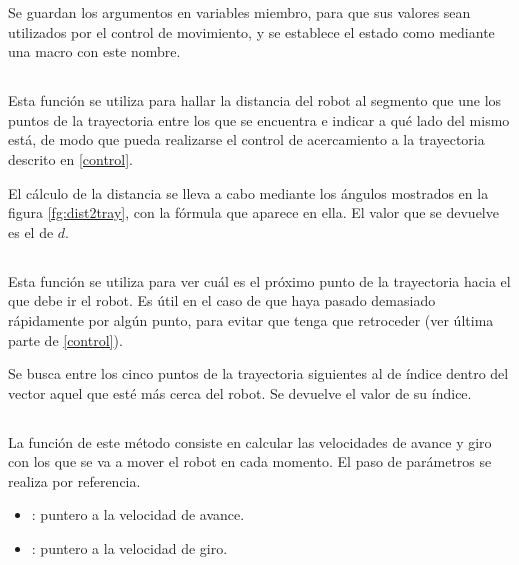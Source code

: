 \noindent
Se guardan los argumentos en variables miembro, para que sus valores sean utilizados por el control de movimiento, y se establece el estado como  mediante una macro con este nombre.

\subsection{}

\noindent
{}

\noindent
Esta función se utiliza para hallar la distancia del robot al segmento que une los puntos de la trayectoria entre los que se encuentra e indicar a qué lado del mismo está, de modo que pueda realizarse el control de acercamiento a la trayectoria descrito en \ref{control}.

\noindent
El cálculo de la distancia se lleva a cabo mediante los ángulos mostrados en la figura \ref{fg:dist2tray}, con la fórmula que aparece en ella. El valor que se devuelve es el de $d$.

\subsection{}

\noindent
{}

\noindent
Esta función se utiliza para ver cuál es el próximo punto de la trayectoria hacia el que debe ir el robot. Es útil en el caso de que haya pasado demasiado rápidamente por algún punto, para evitar que tenga que retroceder (ver última parte de \ref{control}).

\noindent
Se busca entre los cinco puntos de la trayectoria siguientes al de índice  dentro del vector  aquel que esté más cerca del robot. Se devuelve el valor de su índice.

\subsection{}

\noindent
{}

\noindent
La función de este método consiste en calcular las velocidades de avance y giro con los que se va a mover el robot en cada momento. El paso de parámetros se realiza por referencia.

\begin{itemize}
  \item {}: puntero a la velocidad de avance.
  \item {}: puntero a la velocidad de giro.
\end{itemize}

